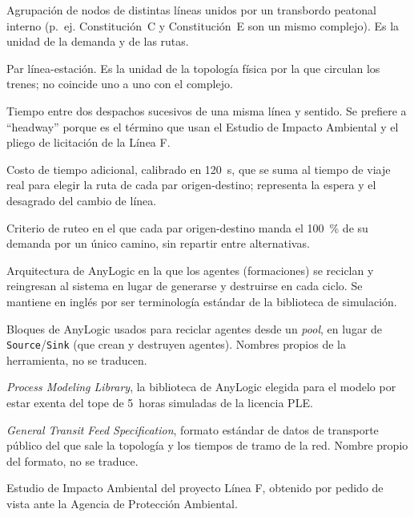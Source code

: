 \documentclass{article}
\begin{document}
\begin{description}[leftmargin=3.2cm, style=nextline]
  \item[Complejo] Agrupación de nodos de distintas líneas unidos por un transbordo
    peatonal interno (p.~ej. Constitución~C y Constitución~E son un mismo
    complejo). Es la unidad de la demanda y de las rutas.
  \item[Nodo] Par línea-estación. Es la unidad de la topología física por la que
    circulan los trenes; no coincide uno a uno con el complejo.
  \item[Intervalo entre trenes] Tiempo entre dos despachos sucesivos de una misma
    línea y sentido. Se prefiere a ``headway'' porque es el término que usan el
    Estudio de Impacto Ambiental y el pliego de licitación de la Línea F.
  \item[Penalización por transbordo] Costo de tiempo adicional, calibrado en 120~s,
    que se suma al tiempo de viaje real para elegir la ruta de cada par
    origen-destino; representa la espera y el desagrado del cambio de línea.
  \item[Asignación todo-o-nada] Criterio de ruteo en el que cada par
    origen-destino manda el 100~\% de su demanda por un único camino, sin repartir
    entre alternativas.
  \item[\textit{Pool}] Arquitectura de AnyLogic en la que los agentes (formaciones)
    se reciclan y reingresan al sistema en lugar de generarse y destruirse en cada
    ciclo. Se mantiene en inglés por ser terminología estándar de la biblioteca de
    simulación.
  \item[\texttt{Enter} / \texttt{Exit}] Bloques de AnyLogic usados para reciclar
    agentes desde un \textit{pool}, en lugar de \texttt{Source}/\texttt{Sink} (que
    crean y destruyen agentes). Nombres propios de la herramienta, no se traducen.
  \item[PML] \textit{Process Modeling Library}, la biblioteca de AnyLogic elegida
    para el modelo por estar exenta del tope de 5~horas simuladas de la licencia
    PLE.
  \item[GTFS] \textit{General Transit Feed Specification}, formato estándar de
    datos de transporte público del que sale la topología y los tiempos de tramo de
    la red. Nombre propio del formato, no se traduce.
  \item[EsIA] Estudio de Impacto Ambiental del proyecto Línea F, obtenido por
    pedido de vista ante la Agencia de Protección Ambiental.
\end{description}
\end{document}
